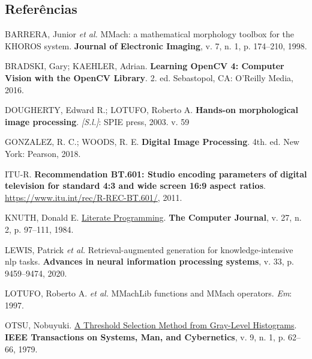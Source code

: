 \documentclass[
  portuguese,
  letterpaper,
  openany,
  oneside,
  12pt,
  a4paper]{book}
\newlength{\cslhangindent}
\newenvironment{CSLReferences}[2] %
 {\begin{list}{}{%
  \setlength{\itemindent}{0pt}
  \setlength{\leftmargin}{0pt}
  \setlength{\parsep}{0pt}
  \ifodd #1
   \setlength{\leftmargin}{\cslhangindent}
   \setlength{\itemindent}{-1\cslhangindent}
  \fi
  \setlength{\itemsep}{#2\baselineskip}}}
 {\end{list}}
\begin{document}
\begin{tcolorbox}
\chapter*{Referências}\label{referuxeancias-1}


\label{refs}
\begin{CSLReferences}{0}{1}
BARRERA, Junior \emph{et al.} {MMach}: a mathematical morphology toolbox
for the {KHOROS} system. \textbf{Journal of Electronic Imaging}, v. 7,
n. 1, p. 174--210, 1998.

BRADSKI, Gary; KAEHLER, Adrian. \textbf{Learning OpenCV 4: Computer
Vision with the OpenCV Library}. 2. ed. Sebastopol, CA: O'Reilly Media,
2016.

DOUGHERTY, Edward R.; LOTUFO, Roberto A. \textbf{Hands-on morphological
image processing}. \emph{{[}S.l.{]}}: SPIE press, 2003. v. 59

GONZALEZ, R. C.; WOODS, R. E. \textbf{Digital Image Processing}. 4th.
ed. New York: Pearson, 2018.

ITU-R. \textbf{Recommendation BT.601: Studio encoding parameters of
digital television for standard 4:3 and wide screen 16:9 aspect ratios}.
\url{https://www.itu.int/rec/R-REC-BT.601/}, 2011.

KNUTH, Donald E. \href{https://doi.org/10.1093/comjnl/27.2.97}{Literate
Programming}. \textbf{The Computer Journal}, v. 27, n. 2, p. 97--111,
1984.

LEWIS, Patrick \emph{et al.} Retrieval-augmented generation for
knowledge-intensive nlp tasks. \textbf{Advances in neural information
processing systems}, v. 33, p. 9459--9474, 2020.

LOTUFO, Roberto A. \emph{et al.} MMachLib functions and MMach operators.
\emph{Em}: 1997.

OTSU, Nobuyuki. \href{https://doi.org/10.1109/TSMC.1979.4310076}{A
Threshold Selection Method from Gray-Level Histograms}. \textbf{IEEE
Transactions on Systems, Man, and Cybernetics}, v. 9, n. 1, p. 62--66,
1979.


\end{CSLReferences}
\end{tcolorbox}
\end{document}
